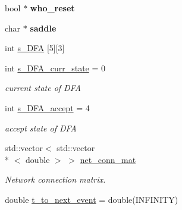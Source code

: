 \begin{DoxyCompactItemize}
\item 
\hypertarget{classLifNetSim_a0ea021e69a7359048121da44a3425b29}{bool $\ast$ {\bfseries who\-\_\-reset}}\label{classLifNetSim_a0ea021e69a7359048121da44a3425b29}

\item 
\hypertarget{classLifNetSim_ac09a65f24be8b916f839233f6f51669b}{char $\ast$ {\bfseries saddle}}\label{classLifNetSim_ac09a65f24be8b916f839233f6f51669b}

\item 
int \hyperlink{classLifNetSim_a12ecd775ae43cbb8747dc5c854736b36}{s\-\_\-\-D\-F\-A} \mbox{[}5\mbox{]}\mbox{[}3\mbox{]}
\item 
\hypertarget{classLifNetSim_a55c2c0050246f1c6e41af78d51939b41}{int \hyperlink{classLifNetSim_a55c2c0050246f1c6e41af78d51939b41}{s\-\_\-\-D\-F\-A\-\_\-curr\-\_\-state} = 0}\label{classLifNetSim_a55c2c0050246f1c6e41af78d51939b41}

\begin{DoxyCompactList}\small\item\em current state of D\-F\-A \end{DoxyCompactList}\item 
\hypertarget{classLifNetSim_aa6babed0405eb1f813a266a08971f2ef}{int \hyperlink{classLifNetSim_aa6babed0405eb1f813a266a08971f2ef}{s\-\_\-\-D\-F\-A\-\_\-accept} = 4}\label{classLifNetSim_aa6babed0405eb1f813a266a08971f2ef}

\begin{DoxyCompactList}\small\item\em accept state of D\-F\-A \end{DoxyCompactList}\item 
\hypertarget{classLifNetSim_a4c8044a60dc01980d6b19832a78877b8}{std\-::vector$<$ std\-::vector\\*
$<$ double $>$ $>$ \hyperlink{classLifNetSim_a4c8044a60dc01980d6b19832a78877b8}{net\-\_\-conn\-\_\-mat}}\label{classLifNetSim_a4c8044a60dc01980d6b19832a78877b8}

\begin{DoxyCompactList}\small\item\em Network connection matrix. \end{DoxyCompactList}\item 
\hypertarget{classLifNetSim_ad15c00b9f8bc10a86ffc73bcbfdcbbb4}{double \hyperlink{classLifNetSim_ad15c00b9f8bc10a86ffc73bcbfdcbbb4}{t\-\_\-to\-\_\-next\-\_\-event} = double(I\-N\-F\-I\-N\-I\-T\-Y)}\label{classLifNetSim_ad15c00b9f8bc10a86ffc73bcbfdcbbb4}


\end{DoxyCompactItemize}
